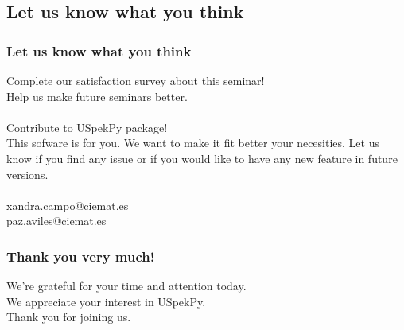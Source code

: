 \documentclass{beamer}
\newcommand{\highlight}[1]{{\color{blue} #1}}
\begin{document}
	\subsection{Let us know what you think}
	
	\begin{frame}
		\frametitle{Let us know what you think}
		\centering
		\highlight{Complete our satisfaction survey about this seminar!}\\
		Help us make future seminars better.\\
		\bigskip
		\href{https://forms.gle/zymzqsLidy5uxKQV6}{}\\
		\bigskip
		\highlight{Contribute to USpekPy package!}\\
		This sofware is for you. We want to make it fit better your necesities. Let us know if you find any issue or if you would like to have any new feature in future versions.\\
		\bigskip
		\href{https://github.com/lmri-met/uspekpy/issues}{}\\
		xandra.campo@ciemat.es\\
		paz.aviles@ciemat.es
	\end{frame}
	
	\begin{frame}
		\frametitle{Thank you very much!}
		\centering
		We’re grateful for your time and attention today. \\
		\bigskip
		We appreciate your interest in USpekPy.\\
		\bigskip
		Thank you for joining us.
	\end{frame}
	
\end{document}
